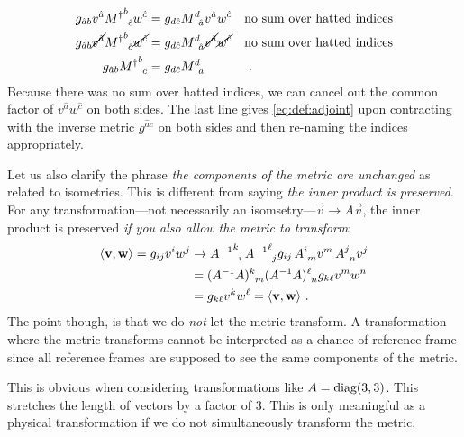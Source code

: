 \begin{example}
\begin{align}
    g_{\hat ab} {v^{\hat a}} {M^\dag}\aij{b}{\hat c} {w^{\hat c}}
    &= 
    g_{d\hat c} M\aij{d}{\hat a} {v^{\hat a}} {w^{\hat c}}
    &&
    \text{no sum over hatted indices}
    \\
    g_{\hat ab} \cancel{v^{\hat a}} {M^\dag}\aij{b}{\hat c} \cancel{w^{\hat c}}
    &= 
    g_{d\hat c} M\aij{d}{\hat a} \cancel{v^{\hat a}} \cancel{w^{\hat c}}
    &&
    \text{no sum over hatted indices}
    \\
    g_{\hat ab} {M^\dag}\aij{b}{\hat c} 
    &= 
    g_{d\hat c} M\aij{d}{\hat a} 
    &&
    \ .
\end{align}
Because there was no sum over hatted indices, we can cancel out the common factor of $v^{\hat a}w^{\hat c}$ on both sides.  The last line gives \eqref{eq:def:adjoint} upon contracting with the inverse metric $g^{\hat a e}$ on both sides and then re-naming the indices appropriately.\footnotemark
\end{example}
% 

\begin{example}
Let us also clarify the phrase \emph{the components of the metric are unchanged} as related to isometries. This is different from saying \emph{the inner product is preserved}. For any transformation---not necessarily an isomsetry---$\vec{v}\to A\vec{v}$, the inner product is preserved \emph{if you also allow the metric to transform}:
\begin{align}
    \la \vec{v}, \vec{w}\ra
    = 
    g_{ij}v^i w^j
    &\to 
    {A\inv}\aij{k}{i}\, {A\inv}\aij{\ell}{j}
    g_{ij}
    \,
    A\aij{i}{m} v^m \, A\aij{j}{n}v^j
    \\
    &= ({A\inv} A)\aij{k}{m} ({A\inv} A)\aij{\ell}{n} g_{k\ell} v^m w^n
    \\
    &= g_{k\ell} v^k w^\ell 
    =\la \vec{v},\vec{w} \ra
    \ .
\end{align}
The point though, is that we do \emph{not} let the metric transform. A transformation where the metric transforms cannot be interpreted as a chance of reference frame since all reference frames are supposed to see the same components of the metric. 

This is obvious when considering transformations like $A = \textnormal{diag}(3,3)$. This stretches the length of vectors by a factor of 3. This is only meaningful as a physical transformation if we do not simultaneously transform the metric.
\end{example}


